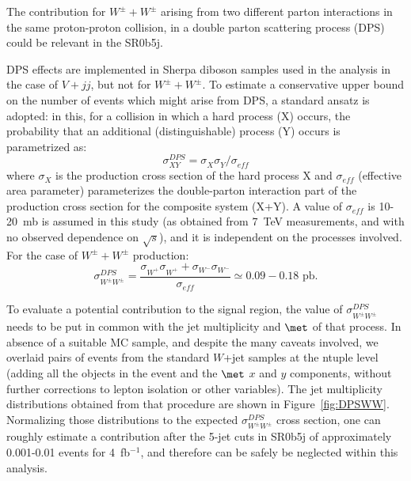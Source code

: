The contribution for $W^\pm+W^\pm$ arising from two different parton interactions in the same
proton-proton collision, in a double parton scattering process (DPS) could be relevant in the SR0b5j.

DPS effects are implemented in Sherpa diboson samples used in the analysis in the case of $V+jj$, but not for $W^\pm+W^\pm$. 
To estimate a conservative upper bound on the number of 
events which might arise from DPS, a standard ansatz is adopted: in this, 
for a collision in which a hard process (X) occurs, the probability that 
an additional (distinguishable) process (Y) occurs is parametrized as:
\begin{equation}
\sigma^{DPS}_{XY} = \sigma^{}_{X}\sigma^{}_{Y}/\sigma^{}_{eff}
\end{equation} 
where $\sigma^{}_{X}$ is the production cross section of the hard 
process X and $\sigma^{}_{eff}$ (effective area parameter) 
parameterizes the double-parton interaction part of the production 
cross section for the composite system (X+Y). 
A value of $\sigma^{}_{eff}$ is 10-20~mb is assumed in this study (as obtained from 7~TeV measurements, and with no observed dependence on $\sqrt{s}$), and it is 
independent on the processes involved. For the case of $W^\pm+W^\pm$ production:
\begin{equation}
\sigma^{DPS}_{W^\pm W^\pm} = \frac{ \sigma^{}_{W^+}\sigma^{}_{W^+} + \sigma^{}_{W^-}\sigma^{}_{W^-}}{\sigma^{}_{eff}} \simeq 0.09-0.18\text{ pb.}
\end{equation} 

To evaluate a potential contribution to the signal region, the value of $\sigma^{DPS}_{W^\pm W^\pm}$ needs to be put in common with the jet multiplicity and $\met$ of that process. In absence of a suitable MC sample, and despite the many caveats involved, we overlaid pairs of events from the standard $W$+jet samples at the ntuple level (adding all the objects in the event and the $\met$ $x$ and $y$ components, without further corrections to lepton isolation or other variables). The jet multiplicity distributions obtained from that procedure are shown in Figure~\ref{fig:DPSWW}. Normalizing those distributions to the expected $\sigma^{DPS}_{W^\pm W^\pm}$ cross section, one can roughly estimate a contribution after the 5-jet cuts in SR0b5j of approximately 0.001-0.01 events for 4~fb$^{-1}$, and therefore can be safely be neglected within this analysis.

